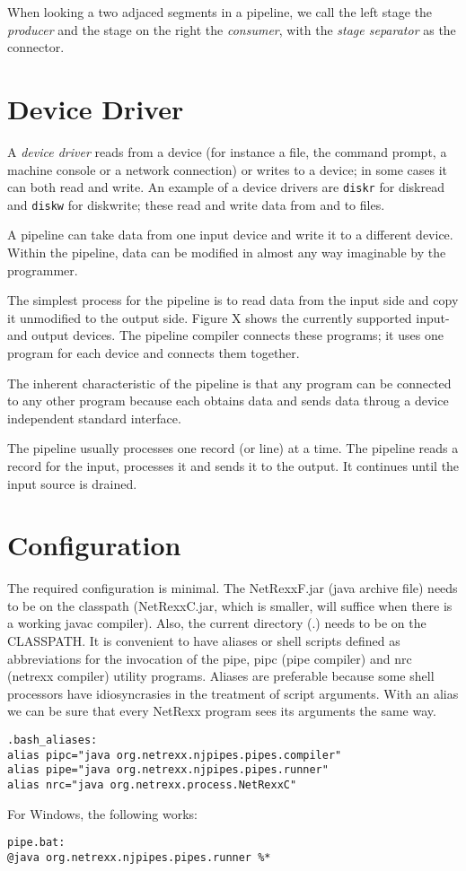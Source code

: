 When looking a two adjaced segments in a pipeline, we call the left
stage the \emph{producer} and the stage on the right the
\emph{consumer}, with the \emph{stage separator} as the connector.
\section{Device Driver}
A \emph{device driver} reads from a device (for instance a file, the
command prompt, a machine console or a network connection) or writes
to a device; in some cases it can both read and write. An example of a
device drivers are \texttt{diskr} for diskread and \texttt{diskw} for
diskwrite; these read and write data from and to files.

A pipeline can take data from one input device and write it to a
different device. Within the pipeline, data can be modified in almost
any way imaginable by the programmer.

The simplest process for the pipeline is to read data from the input
side and copy it unmodified to the output side. Figure X shows the
currently supported input- and output devices. The pipeline compiler
connects these programs; it uses one program for each device and
connects them together.

The inherent characteristic of the pipeline is that any program can be
connected to any other program because each obtains data and sends
data throug a device independent standard interface.

The pipeline usually processes one record (or line) at a time. The
pipeline reads a record for the input, processes it and sends it to
the output. It continues until the input source is drained.


\section{Configuration}
The required configuration is minimal. The NetRexxF.jar (java archive file) needs to be on the classpath (NetRexxC.jar, which is smaller, will suffice when there is a working javac compiler). Also, the current directory (.) needs to be on the CLASSPATH.
It is convenient to have aliases or shell scripts defined as abbreviations for the invocation of the pipe, pipc (pipe compiler) and nrc (netrexx compiler) utility programs. 
Aliases are preferable because some shell processors have
idiosyncrasies in the treatment of script arguments. With an alias we
can be sure that every NetRexx program sees its arguments the same
way.
\begin{verbatim}
.bash_aliases:
alias pipc="java org.netrexx.njpipes.pipes.compiler"
alias pipe="java org.netrexx.njpipes.pipes.runner"
alias nrc="java org.netrexx.process.NetRexxC"
\end{verbatim}
For Windows, the following works:
\begin{verbatim}
pipe.bat:
@java org.netrexx.njpipes.pipes.runner %*
\end{verbatim}
